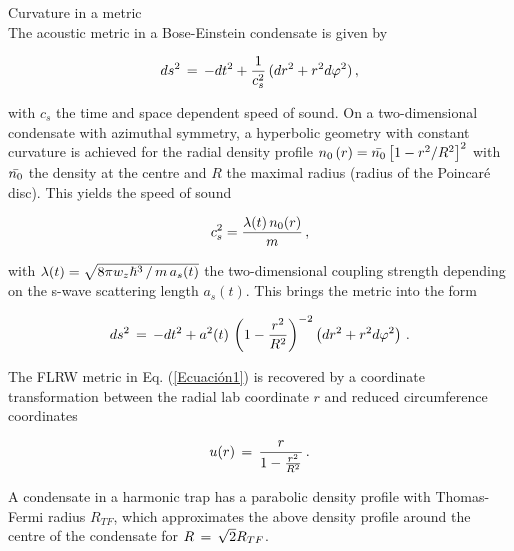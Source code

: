 \documentclass[11pt,twocolumn,letterpaper]{article}
\newcounter{ns}
\begin{document}
Curvature in a metric\\

The acoustic metric in a Bose-Einstein condensate \cite{Lb.14, Lb.32, Lb.46, Lb.47} is given by

\begin{equation}
    \label{Eq.5}
    ds^{2} \thinspace = \thinspace -dt^{2} + \frac{1}{c^{2}_{s}} \thinspace (dr^{2} + r^{2} d \varphi^{2}) \thinspace , 
\end{equation}

with $c_{s}$  the time and space dependent speed of sound. On a two-dimensional condensate with azimuthal symmetry, a hyperbolic geometry with constant curvature is achieved for the radial density profile $n_{0} \thinspace (r) = \Bar{n_{0}} \left[1 - r^{2} / R^{2} \right] ^{2}$ with $\Bar{n_{0}}$ the density at the centre and $R$ the maximal radius (radius of the Poincaré disc). This yields the speed of sound

\begin{equation}
    \label{Eq.6}
    c^{2}_{s} = \frac{\lambda (t) \thinspace n_{0} (r)}{m} \thinspace ,
\end{equation}

with $\lambda (t) = \sqrt{8 \pi w_{z} \hslash^{3} \thinspace / \thinspace m \thinspace a_{s} (t)}$  the two-dimensional coupling strength depending on the s-wave scattering length $a_{s}(t)$.  This brings the metric into the form

\begin{equation}
    \label{Eq.7}
    ds^{2} \thinspace = \thinspace -dt^{2} + a^{2} (t) \thinspace \left( 1 - \frac{r^{2}}{R^{2}} \right)^{-2}  \left( dr^{2} + r^{2} d \varphi^{2} \right) \thinspace .
\end{equation}

The FLRW metric in Eq. (\ref{Ecuación1}) is recovered by a coordinate transformation between the radial lab coordinate $r$ and reduced circumference coordinates

\begin{equation}
    \label{Eq.8}
    u(r) \thinspace = \thinspace \frac{r}{1 - \frac{r^{2}}{R^{2}}} \thinspace .
\end{equation}

A condensate in a harmonic trap has a parabolic density profile with Thomas-Fermi radius $R_{TF}$, which approximates the above density profile around the centre of the condensate for $R \thinspace = \thinspace \sqrt{2} R_{TF}$.\\
\end{document}
